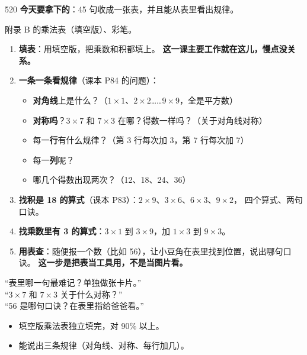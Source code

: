 \begin{lesson}{5}{20}
\textbf{今天要拿下的}：45 句收成一张表，并且能从表里看出规律。

\begin{materials}
附录 B 的乘法表（填空版）、彩笔。
\end{materials}

\begin{enumerate}
  \item \textbf{填表}：用填空版，把乘数和积都填上。
        \textbf{这一课主要工作就在这儿，慢点没关系。}
  \item \textbf{一条一条看规律}（课本 P84 的问题）：
        \begin{itemize}
          \item \textbf{对角线}上是什么？（$1\times1$、$2\times2$……$9\times9$，全是平方数）
          \item \textbf{对称吗}？$3\times7$ 和 $7\times3$ 在哪？得数一样吗？（关于对角线对称）
          \item 每一\textbf{行}有什么规律？（第 3 行每次加 3，第 7 行每次加 7）
          \item 每一\textbf{列}呢？
          \item 哪几个得数出现两次？（12、18、24、36）
        \end{itemize}
  \item \textbf{找积是 18 的算式}（课本 P83）：$2\times9$、$3\times6$、$6\times3$、$9\times2$，
        四个算式、两句口诀。
  \item \textbf{找乘数里有 3 的算式}：$3\times1$ 到 $3\times9$，加 $1\times3$ 到 $9\times3$。
  \item \textbf{用表查}：随便报一个数（比如 56），让小豆角在表里找到位置，说出哪句口诀。
        \textbf{这一步是把表当工具用，不是当图片看。}
\end{enumerate}

\begin{saybox}
“表里哪一句最难记？单独做张卡片。”\\
“$3\times7$ 和 $7\times3$ 关于什么对称？”\\
“56 是哪句口诀？在表里指给爸爸看。”
\end{saybox}

\begin{passbox}
\begin{itemize}
  \item 填空版乘法表独立填完，对 90\% 以上。
  \item 能说出三条规律（对角线、对称、每行加几）。
\end{itemize}
\end{passbox}
\end{lesson}

